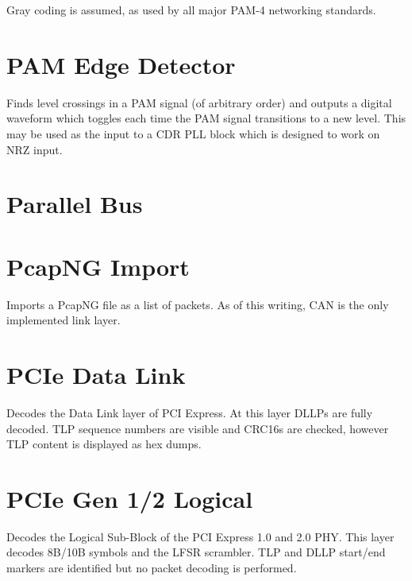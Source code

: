 Gray coding is assumed, as used by all major PAM-4 networking standards.

\pagebreak
\section{PAM Edge Detector}

Finds level crossings in a PAM signal (of arbitrary order) and outputs a digital waveform which toggles each time the
PAM signal transitions to a new level. This may be used as the input to a CDR PLL block which is designed to work on
NRZ input.

\pagebreak
\section{Parallel Bus}

\pagebreak
\section{PcapNG Import}

Imports a PcapNG file as a list of packets. As of this writing, CAN is the only implemented link layer.

\pagebreak
\section{PCIe Data Link}

Decodes the Data Link layer of PCI Express. At this layer DLLPs are fully decoded. TLP sequence numbers are visible
and CRC16s are checked, however TLP content is displayed as hex dumps.

\pagebreak
\section{PCIe Gen 1/2 Logical}

Decodes the Logical Sub-Block of the PCI Express 1.0 and 2.0 PHY. This layer decodes 8B/10B symbols and the LFSR
scrambler. TLP and DLLP start/end markers are identified but no packet decoding is performed.

